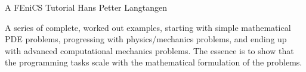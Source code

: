               {A FEniCS Tutorial}
              {Hans Petter Langtangen}

\editornote{[langtangen]}

A series of complete, worked out examples, starting with simple
mathematical PDE problems, progressing with physics/mechanics
problems, and ending up with advanced computational mechanics
problems. The essence is to show that the programming tasks scale with
the mathematical formulation of the problems.
